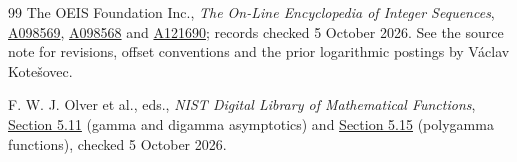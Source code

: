 \begin{thebibliography}{99}
The OEIS Foundation Inc., \emph{The On-Line Encyclopedia of Integer Sequences},
\href{https://oeis.org/A098569}{A098569},
\href{https://oeis.org/A098568}{A098568} and
\href{https://oeis.org/A121690}{A121690}; records checked 5 October 2026.
See the source note for revisions, offset conventions and the prior logarithmic postings by V\'aclav Kote\v{s}ovec.

F. W. J. Olver et al., eds., \emph{NIST Digital Library of Mathematical Functions},
\href{https://dlmf.nist.gov/5.11}{Section 5.11} (gamma and digamma asymptotics) and
\href{https://dlmf.nist.gov/5.15}{Section 5.15} (polygamma functions), checked 5 October 2026.
\end{thebibliography}

